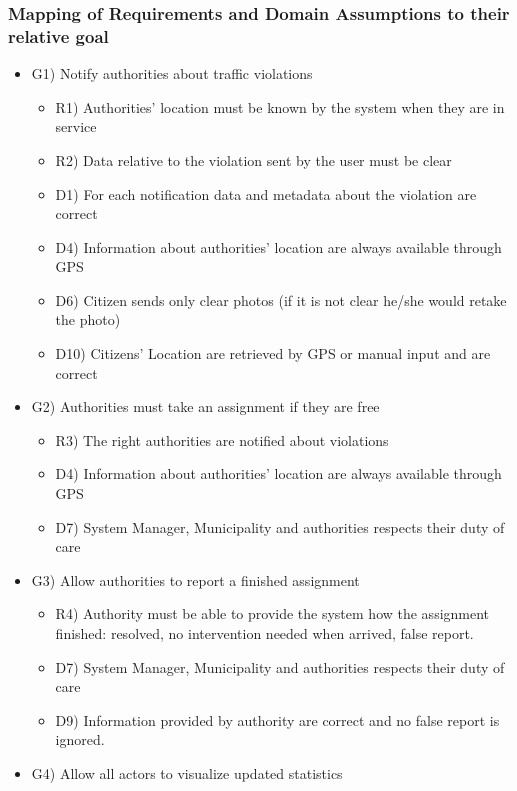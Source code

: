 \subsubsection{Mapping of Requirements and Domain Assumptions to their relative goal}
\begin{itemize}
\item G1) Notify authorities about traffic violations
\begin{itemize}
 \item R1) Authorities’ location must be known by the system when they are in service
\item  R2) Data relative to the violation sent by the user must be clear
 \item D1) For each notification data and metadata about the violation are correct
 \item D4) Information about authorities’ location are always available through  GPS 
 \item D6) Citizen sends only clear photos (if it is not clear he/she would retake the photo)
 \item D10) Citizens’ Location are retrieved by  GPS or manual input and are correct
\end{itemize}
\item G2) Authorities must take an assignment if they are free
\begin{itemize}
 \item R3) The right authorities are notified about violations
 \item D4) Information about authorities’ location are always available through  GPS 
 \item D7) System Manager, Municipality and authorities respects their duty of care
\end{itemize}
\item G3) Allow authorities to report a finished assignment
\begin{itemize}
 \item R4) Authority must be able to provide the system how the assignment finished: resolved, no intervention needed when arrived, false report.
 \item D7) System Manager, Municipality and authorities respects their duty of care
 \item D9) Information provided by authority are correct and no false report is ignored.
\end{itemize}
\item G4) Allow all actors to visualize updated statistics
\begin{itemize}

\end{itemize}
\end{itemize}
